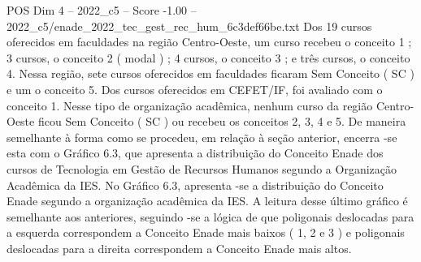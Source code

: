 \begin{textsample}{POS Dim 4 – 2022\_c5 – Score -1.00 – 2022\_c5/enade\_2022\_tec\_gest\_rec\_hum\_6c3def66be.txt}
Dos 19 cursos oferecidos em faculdades na região Centro-Oeste, um curso recebeu o conceito 1 ; 3 cursos, o conceito 2 ( modal ) ; 4 cursos, o conceito 3 ; e três cursos, o conceito 4.
Nessa região, sete cursos oferecidos em faculdades ficaram Sem Conceito ( SC ) e um o conceito 5.
Dos cursos oferecidos em CEFET/IF, foi avaliado com o conceito 1.
Nesse tipo de organização acadêmica, nenhum curso da região Centro-Oeste ficou Sem Conceito ( SC ) ou recebeu os conceitos 2, 3, 4 e 5.
De maneira semelhante à forma como se procedeu, em relação à seção anterior, encerra -se esta com o Gráfico 6.3, que apresenta a distribuição do Conceito Enade dos cursos de Tecnologia em Gestão de Recursos Humanos segundo a Organização Acadêmica da IES.
No Gráfico 6.3, apresenta -se a distribuição do Conceito Enade segundo a organização acadêmica da IES.
A leitura desse último gráfico é semelhante aos anteriores, seguindo -se a lógica de que poligonais deslocadas para a esquerda correspondem a Conceito Enade mais baixos ( 1, 2 e 3 ) e poligonais deslocadas para a direita correspondem a Conceito Enade mais altos.

\end{textsample}

